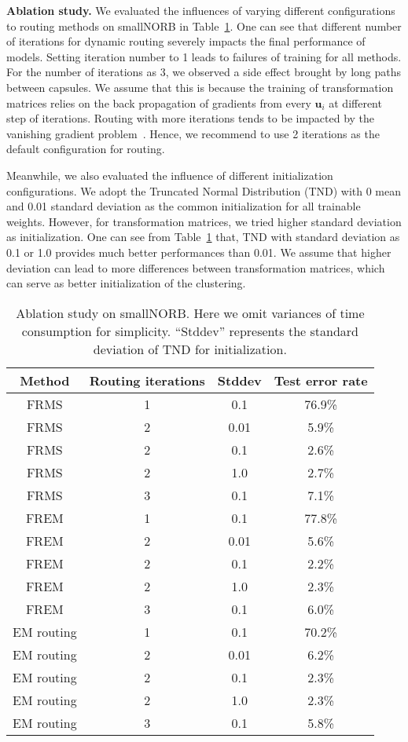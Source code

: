 \documentclass[runningheads]{llncs}
\begin{document}
\textbf{Ablation study.} We evaluated the influences of varying different configurations to routing methods on smallNORB in Table~\ref{tab:ablation}. One can see that different number of iterations for dynamic routing severely impacts the final performance of models. Setting iteration number to 1 leads to failures of training for all methods. For the number of iterations as 3, we observed a side effect brought by long paths between capsules. We assume that this is because the training of transformation matrices relies on the back propagation of gradients from every $\boldsymbol{u}_i$ at different step of iterations. Routing with more iterations tends to be impacted by the vanishing gradient problem~\cite{he2016deep}. Hence, we recommend to use 2 iterations as the default configuration for routing.

Meanwhile, we also evaluated the influence of different initialization configurations. We adopt the Truncated Normal Distribution (TND) with 0 mean and 0.01 standard deviation as the common initialization for all trainable weights. However, for transformation matrices, we tried higher standard deviation as initialization. One can see from Table~\ref{tab:ablation} that, TND with standard deviation as 0.1 or 1.0 provides much better performances than 0.01. We assume that higher deviation can lead to more differences between transformation matrices, which can serve as better initialization of the clustering.
\begin{table}
\centering
\caption{Ablation study on smallNORB. Here we omit variances of time consumption for simplicity. ``Stddev'' represents the standard deviation of TND for initialization.}
\label{tab:ablation}
\begin{tabular}{cccc}
\toprule
Method & Routing iterations & Stddev & Test error rate \\
\midrule
FRMS & 1 & 0.1 & 76.9\% \\
FRMS & 2 & 0.01 & 5.9\% \\
FRMS & 2 & 0.1 & 2.6\% \\
FRMS & 2 & 1.0 & 2.7\% \\
FRMS & 3 & 0.1 & 7.1\% \\
FREM & 1 & 0.1 & 77.8\% \\
FREM & 2 & 0.01 & 5.6\% \\
FREM & 2 & 0.1 & 2.2\% \\
FREM & 2 & 1.0 & 2.3\% \\
FREM & 3 & 0.1 & 6.0\% \\
EM routing & 1 & 0.1 & 70.2\% \\
EM routing & 2 & 0.01 & 6.2\% \\
EM routing & 2 & 0.1 & 2.3\% \\
EM routing & 2 & 1.0 & 2.3\% \\
EM routing & 3 & 0.1 & 5.8\% \\
\bottomrule
\end{tabular}
\end{table}
\end{document}
